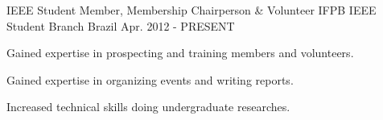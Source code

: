 \begin{cventries}
  \cventry
    {IEEE Student Member, Membership Chairperson \& Volunteer} %
    {IFPB IEEE Student Branch} %
    {Brazil} %
    {Apr. 2012 - PRESENT} %
    {
      \begin{cvitems} %
        \item {Gained expertise in prospecting and training members and volunteers.}
        \item {Gained expertise in organizing events and writing reports.}
        \item {Increased technical skills doing undergraduate researches.}
      \end{cvitems}
    }

\end{cventries}
